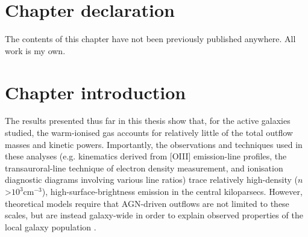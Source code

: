 \section*{Chapter declaration}
\label{section: observations_and_data_reduction: declaration}

The contents of this chapter have not been previously published anywhere. All work is my own.



\newpage


\section{Chapter introduction}
\label{section: muse_f13451_1232: introduction}

The results presented thus far in this thesis show that, for the active galaxies studied, the warm-ionised gas accounts for relatively little of the total outflow masses and kinetic powers. Importantly, the observations and techniques used in these analyses (e.g. kinematics derived from [OIII] emission-line profiles, the transauroral-line technique of electron density measurement, and ionisation diagnostic diagrams involving various line ratios) trace relatively high-density ($n$\;\textgreater\;$10^{3}$\;cm$^{-3}$), high-surface-brightness emission in the central kiloparsecs. However, theoretical models require that AGN-driven outflows are not limited to these scales, but are instead galaxy-wide in order to explain observed properties of the local galaxy population \citep{Silk1998, DiMatteo2005, King2010, Zubovas2014, Curtis2016, Barai2018, Costa2018, Zubovas2023}. 

